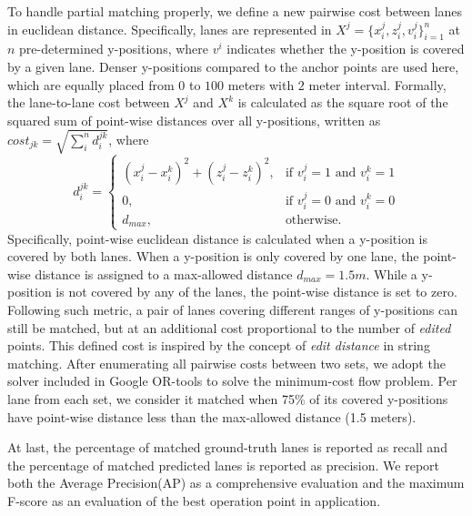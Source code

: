 \documentclass[10pt,twocolumn,letterpaper]{article}
\begin{document}
To handle partial matching properly, we define a new pairwise cost between lanes in euclidean distance. Specifically, lanes are represented in $X^j = \{x^j_i, z^j_i, v^j_i\}_{i=1}^n$ at $n$ pre-determined y-positions, where $v^i$ indicates whether the y-position is covered by a given lane. Denser y-positions compared to the anchor points are used here, which are equally placed from $0$ to $100$ meters with $2$ meter interval. Formally, the lane-to-lane cost between $X^j$ and $X^k$ is calculated as the square root of the squared sum of point-wise distances over all y-positions, written as $cost_{jk} = \sqrt{\sum_i^n d^{jk}_i}$, where
{\small
\begin{equation}
        d^{jk}_i =
        \begin{cases}
            (x^j_i - x^k_i)^2 + (z^j_i - z^k_i)^2,& \text{if } v^j_i = 1 \text{ and } v^k_i = 1\\
            0,              & \text{if } v^j_i = 0 \text{ and } v^k_i = 0\\
            d_{max},            & \text{otherwise. }
        \end{cases} \nonumber
\end{equation}
}
Specifically, point-wise euclidean distance is calculated when a y-position is covered by both lanes. When a y-position is only covered by one lane, the point-wise distance is assigned to a max-allowed distance $d_{max} = 1.5m$. While a y-position is not covered by any of the lanes, the point-wise distance is set to zero. Following such metric, a pair of lanes covering different ranges of y-positions can still be matched, but at an additional cost proportional to the number of \textit{edited} points. This defined cost is inspired by the concept of \textit{edit distance} in string matching. After enumerating all pairwise costs between two sets, we adopt the solver included in Google OR-tools to solve the minimum-cost flow problem. Per lane from each set, we consider it matched when 75\% of its covered y-positions have point-wise distance less than the max-allowed distance (1.5 meters).


At last, the percentage of matched ground-truth lanes is reported as recall and the percentage of matched predicted lanes is reported as precision. We report both the Average Precision(AP) as a comprehensive evaluation and the maximum F-score as an evaluation of the best operation point in application.

\begin{comment}
\begin{figure}[!h]
  \centering
  \texttt{[image: figs/illus\_eval.png]}
  \texttt{[image: figs/illus\_eval\_2.jpg]}
\caption{\textbf{Visualization of evaluation result.} We show two pairs of results, both in image and in 3D coordinates. The matching results are visualized in distinguished colors: the  matched  lane  lines  from prediction and ground-truth  are drawn in red and blue respectively; The false negative ground-truth lanes are shown in cyan, and false positive predicted lanes are shown in purple.}
  \label{fig:illus:eval}
\end{figure}
\end{comment}
\end{document}

